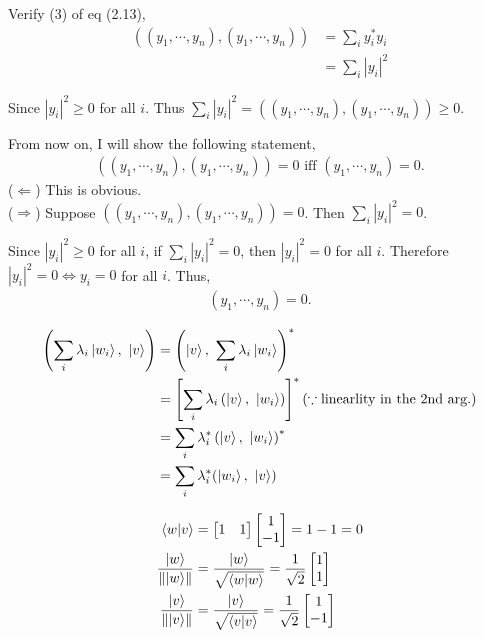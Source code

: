 Verify (3) of eq (2.13),
\begin{align*}
	\left(
		(y_1, \cdots, y_n), (y_1, \cdots, y_n)
	\right)
	&= \sum_i y_i^* y_i\\
	&= \sum_i |y_i|^2
\end{align*}

Since $|y_i|^2 \geq 0$ for all $i$. Thus
$\sum_i |y_i|^2 =
\left(
	(y_1, \cdots, y_n), (y_1, \cdots, y_n)
\right) \geq 0
$.

From now on,  I will show the following statement,
\begin{align*}
	\left(
		(y_1, \cdots, y_n), (y_1, \cdots, y_n)
	\right) = 0
	\text{ iff }  (y_1, \cdots, y_n) = 0.
\end{align*}
($\Leftarrow$) This is obvious.\\
($\Rightarrow$)
Suppose $\left( (y_1, \cdots, y_n), (y_1, \cdots, y_n) \right) = 0$. Then $\sum_i |y_i|^2 = 0$.

Since $|y_i|^2 \geq 0$ for all $i$, if $\sum_i |y_i|^2 = 0$, then $|y_i|^2 = 0$ for all $i$.
Therefore $|y_i|^2 = 0 \Leftrightarrow y_i = 0$  for all $i$.
Thus,
\begin{align*}
	(y_1, \cdots, y_n) = 0.
\end{align*}

\begin{align*}
	\left(\sum_i \lambda_i \ket{w_i},\ \ket{v}\right) &=
	\left(\ket{v},\ \sum_i \lambda_i \ket{w_i}\right)^*\\
	&= \left[\sum_i \lambda_i \left(\ket{v},\ \ket{w_i}  \right) \right]^* (\because \text{linearlity in the 2nd arg.})\\
	&= \sum_i \lambda_i^* \left(\ket{v},\ \ket{w_i} \right)^*\\
	&= \sum_i \lambda_i^* (\ket{w_i},\ \ket{v})
\end{align*}



\begin{align*}
	\braket{w | v} &= \begin{bmatrix}
		1 & 1
	\end{bmatrix}
	\begin{bmatrix}
	1 \\ 
	-1
	\end{bmatrix}
	= 1 - 1 = 0\\
%
	\frac{\ket{w}}{\norm{\ket{w}}} &=
	\frac{\ket{w}}{\sqrt{\braket{w|w}}} = \frac{1}{\sqrt{2}} \begin{bmatrix}
	1 \\ 
	1
	\end{bmatrix}\\
%
	\frac{\ket{v}}{\norm{\ket{v}}} &=
	\frac{\ket{v}}{\sqrt{\braket{v|v}}} = \frac{1}{\sqrt{2}} \begin{bmatrix}
	1 \\ 
	-1
	\end{bmatrix}
\end{align*}



